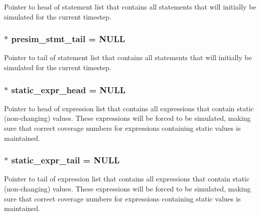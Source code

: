 Pointer to head of statement list that contains all statements that will initially be simulated for the current timestep. 
\subsubsection{$\ast$ {\bf presim\_\-stmt\_\-tail} = NULL}\label{sim_8c_a4}


Pointer to tail of statement list that contains all statements that will initially be simulated for the current timestep. 
\subsubsection{$\ast$ {\bf static\_\-expr\_\-head} = NULL}\label{sim_8c_a1}


Pointer to head of expression list that contains all expressions that contain static (non-changing) values. These expressions will be forced to be simulated, making sure that correct coverage numbers for expressions containing static values is maintained. 
\subsubsection{$\ast$ {\bf static\_\-expr\_\-tail} = NULL}\label{sim_8c_a2}


Pointer to tail of expression list that contains all expressions that contain static (non-changing) values. These expressions will be forced to be simulated, making sure that correct coverage numbers for expressions containing static values is maintained. 